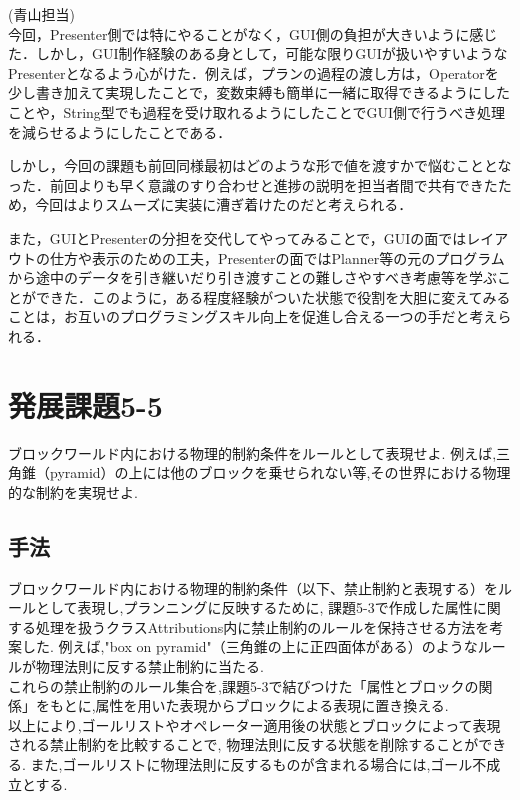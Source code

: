 \documentclass[uplatex,12pt]{jsarticle}
\begin{document}
\noindent (青山担当) \\
今回，Presenter側では特にやることがなく，GUI側の負担が大きいように感じた．しかし，GUI制作経験のある身として，可能な限りGUIが扱いやすいようなPresenterとなるよう心がけた．例えば，プランの過程の渡し方は，Operatorを少し書き加えて実現したことで，変数束縛も簡単に一緒に取得できるようにしたことや，String型でも過程を受け取れるようにしたことでGUI側で行うべき処理を減らせるようにしたことである．

しかし，今回の課題も前回同様最初はどのような形で値を渡すかで悩むこととなった．前回よりも早く意識のすり合わせと進捗の説明を担当者間で共有できたため，今回はよりスムーズに実装に漕ぎ着けたのだと考えられる．

また，GUIとPresenterの分担を交代してやってみることで，GUIの面ではレイアウトの仕方や表示のための工夫，Presenterの面ではPlanner等の元のプログラムから途中のデータを引き継いだり引き渡すことの難しさやすべき考慮等を学ぶことができた．このように，ある程度経験がついた状態で役割を大胆に変えてみることは，お互いのプログラミングスキル向上を促進し合える一つの手だと考えられる．


\section{発展課題5-5}
\begin{screen}
    ブロックワールド内における物理的制約条件をルールとして表現せよ.
    例えば,三角錐（pyramid）の上には他のブロックを乗せられない等,その世界における物理的な制約を実現せよ.
\end{screen}
\subsection{手法}
ブロックワールド内における物理的制約条件（以下、禁止制約と表現する）をルールとして表現し,プランニングに反映するために,
課題5-3で作成した属性に関する処理を扱うクラスAttributions内に禁止制約のルールを保持させる方法を考案した.
例えば,"box on pyramid"（三角錐の上に正四面体がある）のようなルールが物理法則に反する禁止制約に当たる. \\
これらの禁止制約のルール集合を,課題5-3で結びつけた「属性とブロックの関係」をもとに,属性を用いた表現からブロックによる表現に置き換える. \\
以上により,ゴールリストやオペレーター適用後の状態とブロックによって表現される禁止制約を比較することで,
物理法則に反する状態を削除することができる.
また,ゴールリストに物理法則に反するものが含まれる場合には,ゴール不成立とする. 
\end{document}
